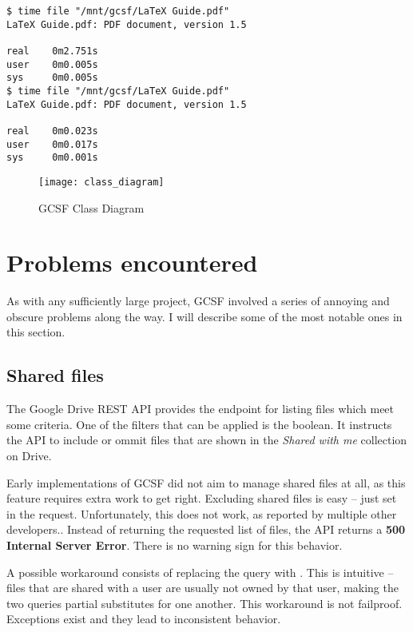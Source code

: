 \begin{lstlisting}[caption=File caching, frame=single, label=file_caching]
$ time file "/mnt/gcsf/LaTeX Guide.pdf"
LaTeX Guide.pdf: PDF document, version 1.5

real    0m2.751s
user    0m0.005s
sys     0m0.005s
$ time file "/mnt/gcsf/LaTeX Guide.pdf"
LaTeX Guide.pdf: PDF document, version 1.5

real    0m0.023s
user    0m0.017s
sys     0m0.001s
\end{lstlisting}


\begin{figure}[bpt]
\caption{GCSF Class Diagram}
\label{fig:gcsf_class_diagram}
\centering
\texttt{[image: class\_diagram]}
\end{figure}


\section{Problems encountered}

As with any sufficiently large project, GCSF involved a series of annoying and obscure problems along the way. I will describe some of the most notable ones in this section.

\subsection{Shared files} \label{shared_files}

The Google Drive REST API provides the  endpoint\cite{files_list_call} for listing files which meet some criteria. One of the filters that can be applied is the  boolean. It instructs the API to include or ommit files that are shown in the \emph{Shared with me} collection on Drive.

Early implementations of GCSF did not aim to manage shared files at all, as this feature requires extra work to get right. Excluding shared files is easy -- just set  in the request. Unfortunately, this does not work, as reported by multiple other developers.\cite{shared_with_me_error}\cite{shared_with_me_error2}\cite{shared_with_me_error3}. Instead of returning the requested list of files, the API returns a \textbf{500 Internal Server Error}. There is no warning sign for this behavior.

A possible workaround consists of replacing the query with . This is intuitive -- files that are shared with a user are usually not owned by that user, making the two queries partial substitutes for one another. This workaround is not failproof. Exceptions exist and they lead to inconsistent behavior.

